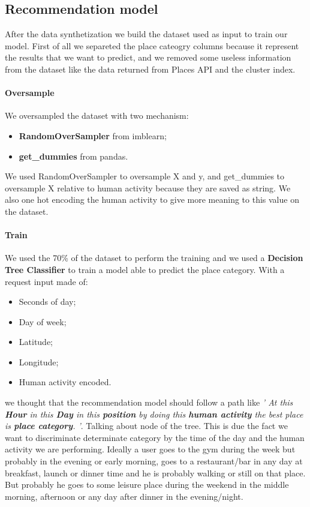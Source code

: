 \documentclass[../../main]{subfiles}
\begin{document}
\subsection{Recommendation model}
After the data synthetization we build the dataset used as input to train our model. First of all we separeted the place cateogry columns because it represent the results that we want to predict, and we removed some useless information from the dataset like the data returned from Places API and the cluster index.
\paragraph*{Oversample}
We oversampled the dataset with two mechanism:
\begin{itemize}
    \item \textbf{RandomOverSampler} from imblearn;
    \item \textbf{get\_dummies} from pandas.
\end{itemize}

We used RandomOverSampler to oversample X and y, and get\_dummies to oversample X relative to human activity
because they are saved as string. We also one hot encoding the human activity to give more meaning to this value on the dataset.

\paragraph*{Train}
We used the 70\% of the dataset to perform the training and we used a \textbf{Decision Tree Classifier} to train a model able to
predict the place category. 
With a request input made of:
\begin{itemize}
    \item Seconds of day;
    \item Day of week;
    \item Latitude;
    \item Longitude;
    \item Human activity encoded.
\end{itemize}
we thought that the recommendation model should follow a path like \textit{' At this \textbf{Hour} in this \textbf{Day} in this \textbf{position} by doing this \textbf{human activity} the best place is \textbf{place category}. '}.
Talking about node of the tree. This is due the fact we want to discriminate determinate category by the time of the day and the human activity we are performing.
Ideally a user goes to the gym during the week but probably in the evening or early morning, 
goes to a restaurant/bar in any day at breakfast, launch or dinner time and he is probably walking or still on that place.
But probably he goes to some leisure place during the weekend in the middle morning, afternoon or any day after dinner in the evening/night.
\end{document}
